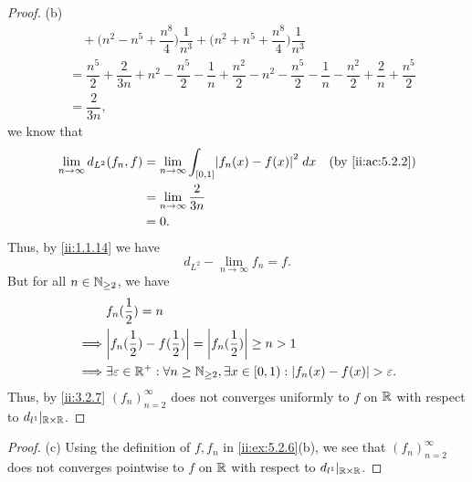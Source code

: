 \begin{proof}{(b)}
\begin{align*}
     & \quad + \bigg(n^2 - n^5 + \dfrac{n^8}{4}\bigg) \dfrac{1}{n^3} + \bigg(n^2 + n^5 + \dfrac{n^8}{4}\bigg) \dfrac{1}{n^3}                                                                                                                                                                                          \\
     & = \dfrac{n^5}{2} + \dfrac{2}{3n} + n^2 - \dfrac{n^5}{2} - \dfrac{1}{n} + \dfrac{n^2}{2} - n^2 - \dfrac{n^5}{2} - \dfrac{1}{n} - \dfrac{n^2}{2} + \dfrac{2}{n} + \dfrac{n^5}{2}                                                                                                                                 \\
     & = \dfrac{2}{3n},
  \end{align*}
  we know that
  \begin{align*}
    \lim_{n \to \infty} d_{L^2}(f_n, f) & = \lim_{n \to \infty} \int_{[0, 1]} \abs{f_n(x) - f(x)}^2 \; dx &  & \by{ii:ac:5.2.2} \\
                                        & = \lim_{n \to \infty} \dfrac{2}{3n}                                                   \\
                                        & = 0.
  \end{align*}
  Thus, by \cref{ii:1.1.14} we have
  \[
    d_{L^2} - \lim_{n \to \infty} f_n = f.
  \]
  But for all \(n \in \mathbb{N}_{\geq 2}\), we have
  \begin{align*}
             & f_n(\dfrac{1}{2}) = n                                                                                                \\
    \implies & \abs{f_n(\dfrac{1}{2}) - f(\dfrac{1}{2})} = \abs{f_n(\dfrac{1}{2})} \geq n > 1                                       \\
    \implies & \exists \varepsilon \in \R^+ : \forall n \geq \N_{\geq 2}, \exists x \in [0, 1) : \abs{f_n(x) - f(x)} > \varepsilon.
  \end{align*}
  Thus, by \cref{ii:3.2.7} \((f_n)_{n = 2}^\infty\) does not converges uniformly to \(f\) on \(\mathbb{R}\) with respect to \(d_{l^1}|_{\mathbb{R} \times \mathbb{R}}\).
\end{proof}

\begin{proof}{(c)}
  Using the definition of \(f, f_n\) in \cref{ii:ex:5.2.6}(b), we see that \((f_n)_{n = 2}^\infty\) does not converges pointwise to \(f\) on \(\mathbb{R}\) with respect to \(d_{l^1}|_{\mathbb{R} \times \mathbb{R}}\).
\end{proof}

